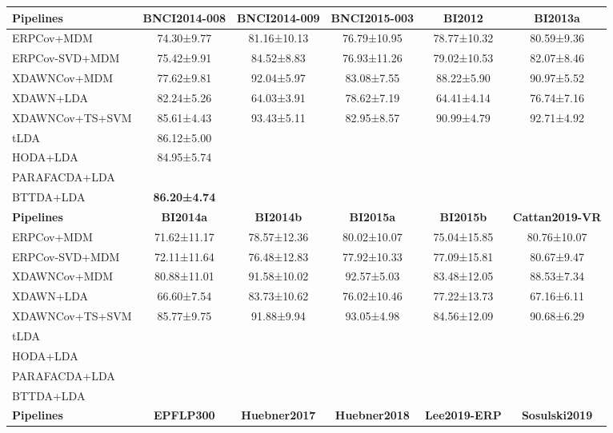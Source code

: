 \begin{tabularx}{\textwidth}{lccccc}
\toprule
\textbf{Pipelines}            & \textbf{BNCI2014-008} & \textbf{BNCI2014-009}
                              & \textbf{BNCI2015-003} & \textbf{BI2012} &
                              \textbf{BI2013a}\\
\midrule
ERPCov+MDM            & 74.30±9.77 & 81.16±10.13 & 76.79±10.95 & 78.77±10.32 & 80.59±9.36 \\
ERPCov-SVD+MDM  & 75.42±9.91 & 84.52±8.83 & 76.93±11.26 & 79.02±10.53 & 82.07±8.46 \\
XDAWNCov+MDM          & 77.62±9.81 & 92.04±5.97 & 83.08±7.55 & 88.22±5.90 & 90.97±5.52 \\
XDAWN+LDA             & 82.24±5.26 & 64.03±3.91 & 78.62±7.19 & 64.41±4.14 & 76.74±7.16 \\
XDAWNCov+TS+SVM       & 85.61±4.43 & 93.43±5.11 & 82.95±8.57 & 90.99±4.79 & 92.71±4.92\\
tLDA                  & 86.12±5.00 & & & & \\ \midrule
HODA+LDA                  & 84.95±5.74 & & & &  \\
PARAFACDA+LDA             & & & & &  \\
BTTDA+LDA                 & \textbf{86.20±4.74}& & & &  \\
\toprule
\textbf{Pipelines} & \textbf{BI2014a} & \textbf{BI2014b} & \textbf{BI2015a} &
\textbf{BI2015b} & \textbf{Cattan2019-VR}\\
\midrule
ERPCov+MDM            & 71.62±11.17 & 78.57±12.36 & 80.02±10.07 & 75.04±15.85 & 80.76±10.07 \\
ERPCov-SVD+MDM  & 72.11±11.64 & 76.48±12.83 & 77.92±10.33 & 77.09±15.81 & 80.67±9.47 \\
XDAWNCov+MDM          & 80.88±11.01 & 91.58±10.02 & 92.57±5.03 & 83.48±12.05 & 88.53±7.34 \\
XDAWN+LDA             & 66.60±7.54 & 83.73±10.62 & 76.02±10.46 & 77.22±13.73 & 67.16±6.11 \\
XDAWNCov+TS+SVM       & 85.77±9.75 & 91.88±9.94 & 93.05±4.98 & 84.56±12.09 &90.68±6.29 \\
tLDA                  & & & & & \\ \midrule
HODA+LDA                  & & & & &  \\
PARAFACDA+LDA             & & & & &  \\
BTTDA+LDA                 & & & & &  \\
\toprule
\textbf{Pipelines} &  \textbf{EPFLP300} & \textbf{Huebner2017} &
\textbf{Huebner2018} & \textbf{Lee2019-ERP} & \textbf{Sosulski2019} \\

\end{tabularx}
